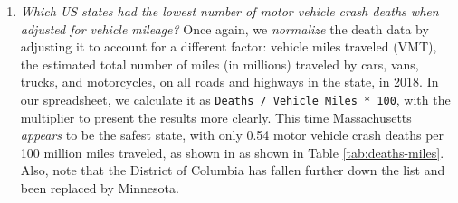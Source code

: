 \documentclass[
  english,
]{book}
\providecommand{\tightlist}{%
  \setlength{\itemsep}{0pt}\setlength{\parskip}{0pt}}
\begin{document}
\begin{enumerate}
\def\labelenumi{\arabic{enumi}.}
\setcounter{enumi}{2}
\tightlist
\item
  \emph{Which US states had the lowest number of motor vehicle crash deaths when adjusted for vehicle mileage?} Once again, we \emph{normalize} the death data by adjusting it to account for a different factor: vehicle miles traveled (VMT), the estimated total number of miles (in millions) traveled by cars, vans, trucks, and motorcycles, on all roads and highways in the state, in 2018. In our spreadsheet, we calculate it as \texttt{Deaths\ /\ Vehicle\ Miles\ *\ 100}, with the multiplier to present the results more clearly. This time Massachusetts \emph{appears} to be the safest state, with only 0.54 motor vehicle crash deaths per 100 million miles traveled, as shown in as shown in Table \ref{tab:deaths-miles}. Also, note that the District of Columbia has fallen further down the list and been replaced by Minnesota.
\end{enumerate}
\end{document}
